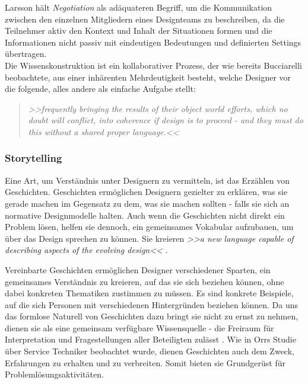 \medskip Larsson hält \emph{Negotiation} als adäquateren Begriff, um die Kommunikation zwischen den einzelnen Mitgliedern eines Designteams zu beschreiben, da die Teilnehmer aktiv den Kontext und Inhalt der Situationen formen und die Informationen nicht passiv mit eindeutigen Bedeutungen und definierten Settings übertragen. \citep{Larsson:2003} \\
Die Wissenskonstruktion ist ein kollaborativer Prozess, der wie bereits Bucciarelli beobachtete, aus einer inhärenten Mehrdeutigkeit besteht, welche Designer vor die folgende, alles andere als einfache Aufgabe stellt: 

\begin{quote}
	\textsl{>>frequently bringing the results of their object world efforts, which no doubt will conflict, into coherence if design is to proceed - and they must do this without a shared proper language.<<}
\begin{flushright}\citep{Bucciarelli:2002}\end{flushright}
\end{quote}

\subsubsection{Storytelling} 
Eine Art, um Verständnis unter Designern zu vermitteln, ist das Erzählen von Geschichten. Geschichten ermöglichen Designern gezielter zu erklären, was sie gerade machen im Gegensatz zu dem, was sie machen sollten - falls sie sich an normative Designmodelle halten. Auch wenn die Geschichten nicht direkt ein Problem lösen, helfen sie dennoch, ein gemeinsames Vokabular aufzubauen, um über das Design sprechen zu können. Sie kreieren \emph{>>a new language capable of describing aspects of the evolving design<<} \citep{Lloyd:2000}.

\medskip Vereinbarte Geschichten ermöglichen Designer verschiedener Sparten, ein gemeinsames Verständnis zu kreieren, auf das sie sich beziehen können, ohne dabei konkreten Thematiken zustimmen zu müssen. Es sind konkrete Beispiele, auf die sich Personen mit verschiedenen Hintergründen beziehen können. Da uns das formlose Naturell von Geschichten dazu bringt sie nicht zu ernst zu nehmen, dienen sie als eine gemeinsam verfügbare Wissensquelle - die Freiraum für Interpretation und Fragestellungen aller Beteiligten zulässt \citep{Erickson:1996}. Wie in Orrs Studie über Service Techniker \citep{Orr:1986} beobachtet wurde, dienen Geschichten auch dem Zweck, Erfahrungen zu erhalten und zu verbreiten. Somit bieten sie Grundgerüst für Problemlösungsaktivitäten.

